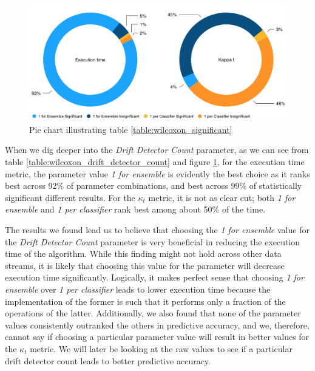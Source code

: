 \begin{figure}
\centering
  \includegraphics[width=\linewidth]{./images/chapter5/wilcoxon_drift_detector_count_pie}
\caption{\label{fig:wilcoxon_drift_detector_count_pie}Pie chart illustrating table \ref{table:wilcoxon_significant}}
\end{figure}



When we dig deeper into the \textit{Drift Detector Count} parameter, as we can see from table \ref{table:wilcoxon_drift_detector_count} and figure \ref{fig:wilcoxon_drift_detector_count_pie}, for the execution time metric, the parameter value \textit{1 for ensemble} is evidently the best choice as it ranks best across 92\% of parameter combinations, and best across 99\% of statistically significant different results. For the $\kappa_t$ metric, it is not as clear cut; both \textit{1 for ensemble} and \textit{1 per classifier} rank best among about 50\% of the time. 

The results we found lead us to believe that choosing the \textit{1 for ensemble} value for the \textit{Drift Detector Count} parameter is very beneficial in reducing the execution time of the algorithm. While this finding might not hold across other data streams, it is likely that choosing this value for the parameter will decrease execution time significantly. Logically, it makes perfect sense that choosing \textit{1 for ensemble} over \textit{1 per classifier} leads to lower execution time because the implementation of the former is such that it performs only a fraction of the operations of the latter. Additionally, we also found that none of the parameter values consistently outranked the others in predictive accuracy, and we, therefore, cannot say if choosing a particular parameter value will result in better values for the $\kappa_t$ metric. We will later be looking at the raw values to see if a particular drift detector count leads to better predictive accuracy.

